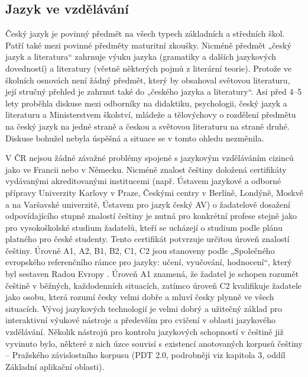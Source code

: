 \begin{multicols}{2}
\subsection{Jazyk ve vzdělávání}

Český jazyk je povinný předmět na všech typech základních a středních škol. Patří také mezi povinné předměty maturitní zkoušky. Nicméně předmět „český jazyk a literatura“ zahrnuje výuku jazyka (gramatiky a dalších jazykových dovedností) a literatury (včetně některých pojmů z literární teorie). Protože ve školních osnovách není žádný předmět, který by obsahoval světovou literaturu, její stručný přehled je zahrnut také do „českého jazyka a literatury“. Asi před 4–5 lety proběhla diskuse mezi odborníky na didaktiku, psychologii, český jazyk a literaturu a Ministerstvem školství, mládeže a tělovýchovy o rozdělení předmětu na český jazyk na jedné straně a českou a světovou literaturu na straně druhé. Diskuse bohužel nebyla úspěšná a situace se v tomto ohledu nezměnila.

V ČR nejsou žádné závažné problémy spojené s jazykovým vzděláváním cizinců jako ve Francii nebo v Německu. Nicméně znalost češtiny doložená certifikáty vydávanými akreditovanými institucemi (např. Ústavem jazykové a odborné přípravy Univerzity Karlovy v Praze, Českými centry v Berlíně, Londýně, Moskvě a na Varšavské univerzitě, Ústavem pro jazyk český AV) o žadatelově dosažení odpovídajícího stupně znalostí češtiny je nutná pro konkrétní profese stejně jako pro vysokoškolské studium žadatelů, kteří se ucházejí o studium podle plánu platného pro české studenty. Tento certifikát potvrzuje určitou úroveň znalostí češtiny. Úrovně A1, A2, B1, B2, C1, C2 jsou stanoveny podle „Společného evropského referenčního rámce pro jazyky: učení, vyučování, hodnocení“, který byl sestaven Radou Evropy \cite{Note7}. Úroveň A1 znamená, že žadatel je schopen rozumět češtině v běžných, každodenních situacích, zatímco úroveň C2 kvalifikuje žadatele jako osobu, která rozumí česky velmi dobře a mluví česky plynně ve všech situacích. Vývoj jazykových technologií je velmi dobrý a užitečný základ pro interaktivní výukové nástroje a především pro cvičení v oblasti jazykového vzdělávání. Několik nástrojů pro kontrolu jazykových schopností v češtině již vyvinuto bylo, některé z nich úzce souvisí s existencí anotovaných korpusů češtiny – Pražského závislostního korpusu (PDT 2.0, podrobněji viz kapitola 3, oddíl Základní aplikační oblasti).\vspace*{-0.09cm}


\end{multicols}
